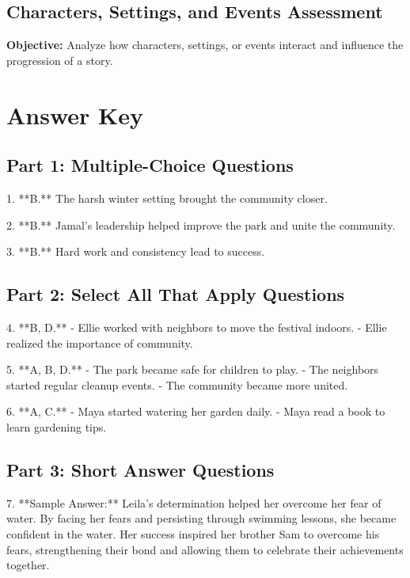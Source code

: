 \documentclass[12pt]{article}
\begin{document}
\subsection*{Characters, Settings, and Events Assessment}
\onehalfspacing

\begin{tcolorbox}[colframe=black!40, colback=gray!0, title=Learning Objective]
\textbf{Objective:} Analyze how characters, settings, or events interact and influence the progression of a story.
\end{tcolorbox}

\section*{Answer Key}

\subsection*{Part 1: Multiple-Choice Questions}

1. **B.** The harsh winter setting brought the community closer.  

2. **B.** Jamal’s leadership helped improve the park and unite the community.  

3. **B.** Hard work and consistency lead to success.  

\subsection*{Part 2: Select All That Apply Questions}

4. **B, D.**  
   - Ellie worked with neighbors to move the festival indoors.  
   - Ellie realized the importance of community.  

5. **A, B, D.**  
   - The park became safe for children to play.  
   - The neighbors started regular cleanup events.  
   - The community became more united.  

6. **A, C.**  
   - Maya started watering her garden daily.  
   - Maya read a book to learn gardening tips.  

\subsection*{Part 3: Short Answer Questions}

7. **Sample Answer:** Leila’s determination helped her overcome her fear of water. By facing her fears and persisting through swimming lessons, she became confident in the water. Her success inspired her brother Sam to overcome his fears, strengthening their bond and allowing them to celebrate their achievements together.  
\end{document}
